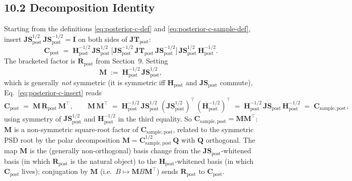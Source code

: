 \documentclass[11pt]{article}
\begin{document}
\subsection*{10.2 Decomposition Identity}

Starting from the definitions \eqref{eq:posterior-c-def} and \eqref{eq:posterior-c-sample-def}, insert $\mathbf{JS}_{\mathrm{post}}^{1/2}\,\mathbf{JS}_{\mathrm{post}}^{-1/2} = \mathbf I$ on both sides of $\mathbf{JT}_{\mathrm{post}}$:
\begin{equation}
\mathbf C_{\mathrm{post}}
\;=\;
\mathbf H_{\mathrm{post}}^{-1/2}\,
\mathbf{JS}_{\mathrm{post}}^{1/2}\,
\bigl[\mathbf{JS}_{\mathrm{post}}^{-1/2}\,
\mathbf{JT}_{\mathrm{post}}\,
\mathbf{JS}_{\mathrm{post}}^{-1/2}\bigr]\,
\mathbf{JS}_{\mathrm{post}}^{1/2}\,
\mathbf H_{\mathrm{post}}^{-1/2}.
\label{eq:posterior-c-insert}
\end{equation}
The bracketed factor is $\mathbf R_{\mathrm{post}}$ from Section~9. Setting
\begin{equation}
\mathbf M
\;:=\;
\mathbf H_{\mathrm{post}}^{-1/2}\,
\mathbf{JS}_{\mathrm{post}}^{1/2},
\label{eq:posterior-M-def}
\end{equation}
which is generally \emph{not} symmetric (it is symmetric iff $\mathbf H_{\mathrm{post}}$ and $\mathbf{JS}_{\mathrm{post}}$ commute), Eq.\ \eqref{eq:posterior-c-insert} reads
\begin{equation}
\mathbf C_{\mathrm{post}}
\;=\;
\mathbf M\,
\mathbf R_{\mathrm{post}}\,
\mathbf M^\top,
\qquad
\mathbf M\,\mathbf M^\top
\;=\;
\mathbf H_{\mathrm{post}}^{-1/2}\,
\mathbf{JS}_{\mathrm{post}}^{1/2}\,
(\mathbf{JS}_{\mathrm{post}}^{1/2})^\top\,
(\mathbf H_{\mathrm{post}}^{-1/2})^\top
\;=\;
\mathbf H_{\mathrm{post}}^{-1/2}\,
\mathbf{JS}_{\mathrm{post}}\,
\mathbf H_{\mathrm{post}}^{-1/2}
\;=\;
\mathbf C_{\mathrm{sample},\mathrm{post}},
\label{eq:posterior-c-MMT}
\end{equation}
using symmetry of $\mathbf{JS}_{\mathrm{post}}^{1/2}$ and $\mathbf H_{\mathrm{post}}^{-1/2}$ in the third equality. So $\mathbf C_{\mathrm{sample},\mathrm{post}} = \mathbf M \mathbf M^\top$: $\mathbf M$ is a non-symmetric square-root factor of $\mathbf C_{\mathrm{sample},\mathrm{post}}$, related to the symmetric PSD root by the polar decomposition $\mathbf M = \mathbf C_{\mathrm{sample},\mathrm{post}}^{1/2}\, \mathbf Q$ with $\mathbf Q$ orthogonal. The map $\mathbf M$ is the (generally non-orthogonal) basis change from the $\mathbf{JS}_{\mathrm{post}}$-whitened basis (in which $\mathbf R_{\mathrm{post}}$ is the natural object) to the $\mathbf H_{\mathrm{post}}$-whitened basis (in which $\mathbf C_{\mathrm{post}}$ lives); conjugation by $\mathbf M$ (i.e.\ $B \mapsto \mathbf M B \mathbf M^\top$) sends $\mathbf R_{\mathrm{post}}$ to $\mathbf C_{\mathrm{post}}$.
\end{document}
